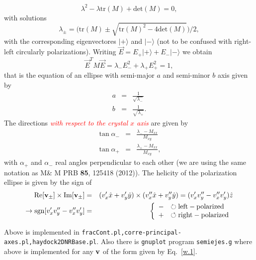 \documentclass[preprint,12pt]{revtex4}
\begin{document}
\begin{equation}\label{w.39}
\lambda^2 -\lambda \mathrm{tr}(M) + \mathrm{det}(M)=0
,
\end{equation}
with solutions
\begin{equation}\label{h.56}
\lambda_\pm=\big(\mathrm{tr}(M)\pm\sqrt{\mathrm{tr}(M)^2-4\mathrm{det}(M)}\big)/2
,
\end{equation}
with the corresponding
eigenvectores $|+\rangle$ and $|-\rangle$ (not to be confused with
right-left circularly polarizations).
Writing $\vec E=E_+|+\rangle + E_-|-\rangle$ we obtain
\begin{equation}\label{w.51}
\vec E^T M \vec E=\lambda_- E_-^2 + \lambda_+ E_+^2 = 1
,
\end{equation}
that is the equation of an ellipse with semi-major $a$ and semi-minor
$b$ axis given by
\begin{eqnarray}\label{w.69}
a&=&\frac{1}{\sqrt{\lambda_-}}
\\
b&=&\frac{1}{\sqrt{\lambda_+}}
.
\end{eqnarray}
The directions {\textcolor{red}{\it with respect to the crystal $x$ axis}} are given by
\begin{eqnarray}\label{w.70}
\tan\alpha_-&=&\frac{\lambda_- - M_{xx}}{M_{xy}}
\\
\tan\alpha_+&=&\frac{\lambda_+ - M_{xx}}{M_{xy}}
,
\end{eqnarray}
with $\alpha_+$ and $\alpha_-$ real angles perpendicular to each other
(we are using the same notation as M\& M PRB {\bf 85}, 125418 (2012)).
The helicity of the polarization ellipse is given by the sign of
\begin{eqnarray}\label{w.89}
\mathrm{Re}[\mathbf{v}_\pm]\times\mathrm{Im}[\mathbf{v}_\pm]
&=&
(v_x'\hat x+v_y'\hat y)
\times
(v_x''\hat x+v_y''\hat y)
=(v_x'v_y''-v_x''v_y')\hat z
\nonumber\\
\to \mathrm{sgn}[v_x'v_y''-v_x''v_y']
&=&\left\{\begin{array}{cl}
-&\circlearrowright\mathrm{left-polarized}
\\ 
+&\circlearrowleft\mathrm{right-polarized}
\end{array}\right.
\end{eqnarray}

Above is implemented in
\verb=fracCont.pl,corre-principal-axes.pl,haydock2DNRBase.pl=. Also
there is \verb=gnuplot= program \verb=semiejes.g= where above is
implemented for any $\mathbf{v}$ of the form given by Eq.~\eqref{w.1}.

\appendix
\end{document}
